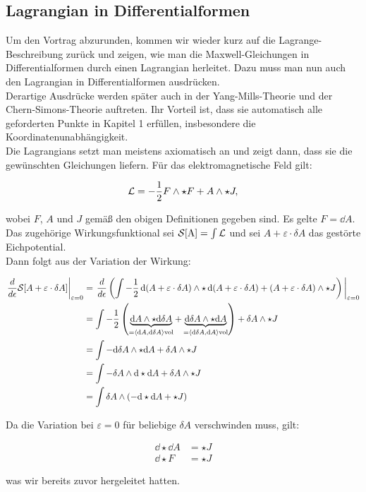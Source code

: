 \subsection{Lagrangian in Differentialformen}

Um den Vortrag abzurunden, kommen wir wieder kurz auf die Lagrange-Beschreibung zurück und zeigen, wie man die Maxwell-Gleichungen in Differentialformen durch einen Lagrangian herleitet. Dazu muss man nun auch den Lagrangian in Differentialformen ausdrücken. \\

Derartige Ausdrücke werden später auch in der Yang-Mills-Theorie und der Chern-Simons-Theorie auftreten. Ihr Vorteil ist, dass sie automatisch alle geforderten Punkte in Kapitel 1 erfüllen, insbesondere die Koordinatenunabhängigkeit. \\

Die Lagrangians setzt man meistens axiomatisch an und zeigt dann, dass sie die gewünschten Gleichungen liefern. Für das elektromagnetische Feld gilt:

\begin{align}
\mathcal{L} = - \frac{1}{2} F \wedge \star F + A \wedge \star J,
\end{align}

wobei $F$, $A$ und $J$ gemäß den obigen Definitionen gegeben sind. Es gelte $F = \dd A$. \\

Das zugehörige Wirkungsfunktional sei $\mathcal{S} \text{[A]}=\int \mathcal{L}$ und sei $A + \varepsilon \cdot \delta A$ das gestörte Eichpotential. \\
Dann folgt aus der Variation der Wirkung: 

\begin{align*}
\eval{\frac{d}{d \epsilon} \mathcal{S}[A + \varepsilon \cdot \delta A]}_{\varepsilon=0} &= \eval{\frac{d}{d \epsilon} \left( \int - \frac{1}{2} \dd(A + \varepsilon \cdot \delta A) \w \star \dd(A + \varepsilon \cdot \delta A) + (A + \varepsilon \cdot \delta A) \w \star J \right)}_{\varepsilon=0} \\
&= \int - \frac{1}{2} \left(\underbrace{\dd A  \w \star \dd \delta A}_{=  \left< \dd A, \dd \delta A \right>\text{vol}}  + \underbrace{\dd \delta A \w \star \dd A}_{=  \left< \dd \delta A, \dd A \right>\text{vol}} \right) + \delta A \w \star J \\
&= \int - \dd \delta A \w \star \dd A + \delta A \w \star J  \\
&= \int - \delta A \w \dd \star \dd A + \delta A \w \star J \\
&= \int \delta A \w \left( - \dd \star \dd A + \star J \right)
\end{align*}

Da die Variation bei $\varepsilon = 0$ für beliebige $\delta A$ verschwinden muss, gilt: 

\begin{align}
\dd \star \dd A &= \star J \\
\dd \star F &= \star J
\end{align}

was wir bereits zuvor hergeleitet hatten.
